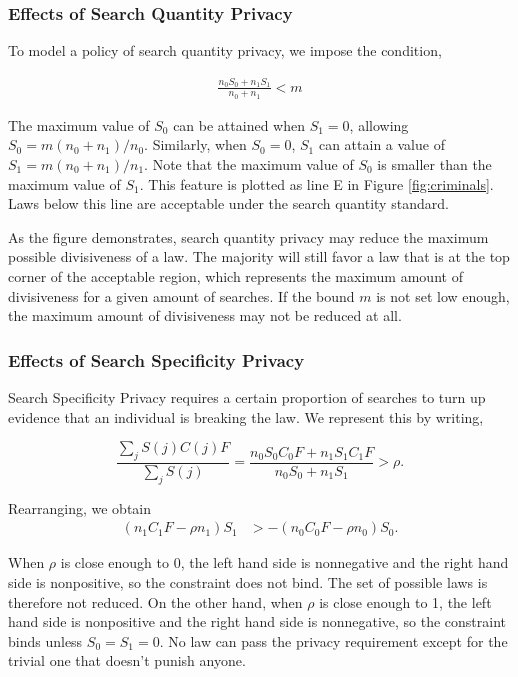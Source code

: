 \subsubsection{Effects of Search Quantity Privacy}

To model a policy of search quantity privacy, we impose the condition, 

\begin{align}
\frac{n_0 S_0 + n_1 S_1}{n_0 + n_1}  < m
\end{align}

The maximum value of $S_0$ can be attained when $S_1 = 0$, allowing $S_0 = m (n_0 + n_1)/n_0$.  Similarly, when $S_0 = 0$, $S_1$ can attain a value of $S_1 = m (n_0 + n_1)/n_1$.   Note that the maximum value of $S_0$ is smaller than the maximum value of $S_1$.  This feature is plotted as line E in Figure \ref{fig:criminals}.  Laws below this line are acceptable under the search quantity standard.  

As the figure demonstrates, search quantity privacy may reduce the maximum possible divisiveness of a law.  The majority will still favor a law that is at the top corner of the acceptable region, which represents the maximum amount of divisiveness for a given amount of searches.  If the bound $m$ is not set low enough, the maximum amount of divisiveness may not be reduced at all.

\subsubsection{Effects of Search Specificity Privacy}

Search Specificity Privacy requires a certain proportion of searches to turn up evidence that an individual is breaking the law.  We represent this by writing,

$$\frac{\sum_j S(j)C(j)F}{\sum_j S(j)} = \frac{ n_0 S_0C_0F + n_1 S_1C_1F}{n_0 S_0 + n_1 S_1}  > \rho.$$

Rearranging, we obtain
\begin{align}
\nonumber  (n_1 C_1 F - \rho n_1 ) S_1 &>  - (n_0 C_0F - \rho n_0 )S_0.
\end{align}

When $\rho$ is close enough to 0, the left hand side is nonnegative and the right hand side is nonpositive, so the constraint does not bind.  The set of possible laws is therefore not reduced.  On the other hand, when $\rho$ is close enough to 1, the left hand side is nonpositive and the right hand side is nonnegative, so the constraint binds unless $S_0 = S_1 = 0$.  No law can pass the privacy requirement except for the trivial one that doesn't punish anyone.  


